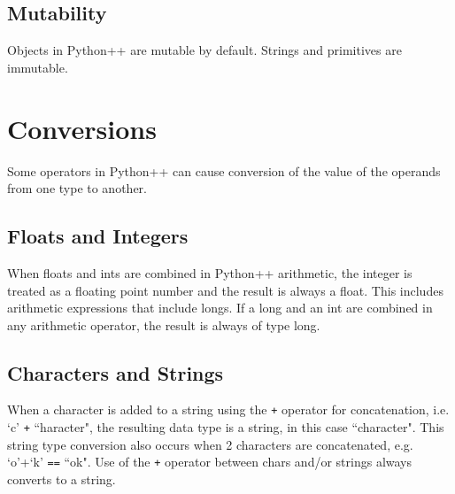\documentclass{article}
\begin{document}
\subsection{Mutability}
Objects in Python++ are mutable by default. Strings and primitives are immutable.

\section{Conversions}
Some operators in Python++ can cause conversion of the value of the operands from one type to another.  

\subsection{Floats and Integers}
When floats and ints are combined in Python++ arithmetic, the integer is treated as a floating point number and the result is always a float.  This includes arithmetic expressions that include longs. If a long and an int are combined in any arithmetic operator, the result is always of type long.

\subsection{Characters and Strings}
When a character is added to a string using the \texttt{+} operator for concatenation, i.e. `c' \texttt{+} ``haracter", the resulting data type is a string, in this case ``character".  This string type conversion also occurs when 2 characters are concatenated, e.g. `o'+`k' \texttt{==} ``ok".  Use of the \texttt{+} operator between chars and/or strings always converts to a string.
\end{document}

